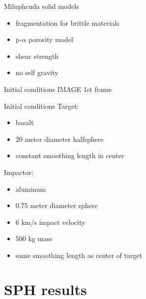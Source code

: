 \documentclass{beamer}
\begin{document}
\begin{frame}{Miluphcuda solid models}
	\begin{itemize}
		\item fragmentation for brittle materials \pause
		\item p-$\alpha$ porosity model \pause
		\item shear strength \pause
		\item no self gravity \pause

	\end{itemize}
\end{frame}

\begin{frame}{Initial conditions}
	IMAGE 1st frame
\end{frame}

\begin{frame}{Initial conditions}
Target:
\begin{itemize}
	\item basalt \pause
	\item 20 meter diameter halfsphere \pause
	\item constant smoothing length in center \pause
\end{itemize} 
Impactor:
\begin{itemize}
	\item aluminum \pause
	\item 0.75 meter diameter sphere \pause
	\item 6 km/s impact velocity \pause
	\item 500 kg mass \pause
	\item same smoothing length as center of target \pause
\end{itemize} 
\end{frame}

\section{SPH results}

\end{document}
